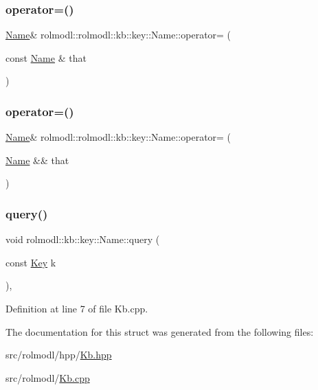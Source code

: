 \subsubsection{\texorpdfstring{operator=()}{operator=()}\hspace{0.1cm}{\footnotesize\ttfamily [1/2]}}
{\footnotesize\ttfamily \mbox{\hyperlink{structrolmodl_1_1rolmodl_1_1kb_1_1key_1_1_name}{Name}}\& rolmodl\+::rolmodl\+::kb\+::key\+::\+Name\+::operator= (\begin{DoxyParamCaption}\item[{const \mbox{\hyperlink{structrolmodl_1_1rolmodl_1_1kb_1_1key_1_1_name}{Name}} \&}]{that }\end{DoxyParamCaption})\hspace{0.3cm}{\ttfamily [delete]}}

\mbox{\label{structrolmodl_1_1rolmodl_1_1kb_1_1key_1_1_name_af337806e2a0801749f5e9dee80021320}} 
\subsubsection{\texorpdfstring{operator=()}{operator=()}\hspace{0.1cm}{\footnotesize\ttfamily [2/2]}}
{\footnotesize\ttfamily \mbox{\hyperlink{structrolmodl_1_1rolmodl_1_1kb_1_1key_1_1_name}{Name}}\& rolmodl\+::rolmodl\+::kb\+::key\+::\+Name\+::operator= (\begin{DoxyParamCaption}\item[{\mbox{\hyperlink{structrolmodl_1_1rolmodl_1_1kb_1_1key_1_1_name}{Name}} \&\&}]{that }\end{DoxyParamCaption})\hspace{0.3cm}{\ttfamily [delete]}}

\mbox{\label{structrolmodl_1_1rolmodl_1_1kb_1_1key_1_1_name_a0fb871693550e5d51a67980a49d4568f}} 
\subsubsection{\texorpdfstring{query()}{query()}}
{\footnotesize\ttfamily void rolmodl\+::kb\+::key\+::\+Name\+::query (\begin{DoxyParamCaption}\item[{const \mbox{\hyperlink{namespacerolmodl_1_1rolmodl_1_1kb_a188e00b289aeb95ae45fb6bf2923e7e2}{Key}}}]{k }\end{DoxyParamCaption})\hspace{0.3cm}{\ttfamily [static]}, {\ttfamily [noexcept]}}



Definition at line 7 of file Kb.\+cpp.



The documentation for this struct was generated from the following files\+:\begin{DoxyCompactItemize}
\item 
src/rolmodl/hpp/\mbox{\hyperlink{_kb_8hpp}{Kb.\+hpp}}\item 
src/rolmodl/\mbox{\hyperlink{_kb_8cpp}{Kb.\+cpp}}\end{DoxyCompactItemize}
